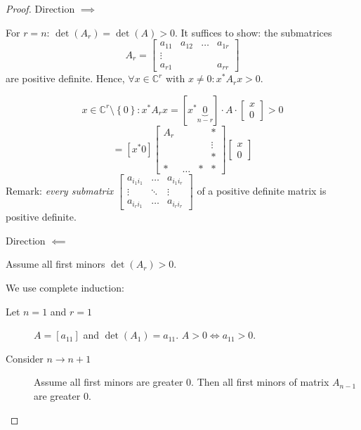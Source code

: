 \documentclass{article}
\numberwithin{lecref}{section}
\newcommand{\set}[1]{\left\{#1\right\}}
\begin{document}
\begin{proof}
  Direction $\implies$

  For $r = n$: $\det(A_r) = \det(A) > 0$.
  It suffices to show: the submatrices
  \[ A_r = \begin{bmatrix} a_{11} & a_{12} & \ldots & a_{1r} \\ \vdots & & & \\ a_{r1} &  & & a_{rr} \end{bmatrix} \]
  are positive definite.
  Hence, $\forall x \in \mathbb C^r$ with $x \neq 0: x^* A_r x > 0$.

  \[ x \in \mathbb C^r \setminus \set{0}: x^* A_r x = \left[x^* \underbrace{0}_{n - r}\right] \cdot A \cdot \begin{bmatrix} x \\ 0 \end{bmatrix} > 0 \]
  \[ = [x^* 0] \begin{bmatrix} A_r & & & * \\ & & & \vdots \\ & & & * \\ * & \ldots & * & * \end{bmatrix} \begin{bmatrix} x \\ 0\end{bmatrix} \]
  Remark: \emph{every submatrix}
  $\begin{bmatrix} a_{i_1 i_1} & \ldots & a_{i_1 i_r} \\ \vdots & \ddots & \vdots \\ a_{i_r i_1} & \ldots & a_{i_r i_r} \end{bmatrix}$
  of a positive definite matrix is positive definite.

  Direction $\impliedby$

  Assume all first minors $\det(A_r) > 0$.

  We use complete induction:
  \begin{description}
    \item[Let $n=1$ and $r=1$]
      $A = [a_{11}]$ and $\det(A_1) = a_{11}$.
      $A > 0 \iff a_{11} > 0$.
    \item[Consider $n \to n+1$]
      Assume all first minors are greater 0.
      Then all first minors of matrix $A_{n-1}$ are greater 0.
  \end{description}
\end{proof}
\end{document}
